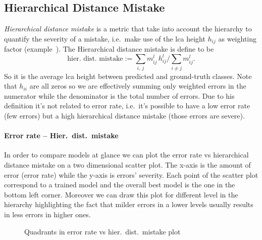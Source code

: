 \subsection{Hierarchical Distance Mistake}
\label{subsec:hierarchical-distance-mistake}
\emph{Hierarchical distance mistake} is a metric that take into account the
hierarchy to quantify the severity of a mistake, i.e.\ make use of the
\acrshort{lca} height $h_{ij}$ as weighting factor
(example~). The Hierarchical distance mistake is
define to be
\begin{equation}
  \textrm{hier.\ dist.\ mistake} :=
  \sum_{i, \, j} m_{ij}^l \, h_{ij}^l \bigg/ \sum_{i \ne j} m_{ij}^l.
  \label{eq:hierarchical-distance-mistake}
\end{equation}
So it is the average \acrshort{lca} height between predicted and ground-truth
classes. Note that $h_{ii}$ are all zeros so we are effectively summing only
weighted errors in the numerator while the denominator is the total number of
errors. Due to his definition it's not related to error rate, i.e.\ it's possible
to have a low error rate (few errors) but a high hierarchical distance mistake
(those errors are severe).

\paragraph{Error rate -- Hier.\ dist.\ mistake}
\label{par:error-rate-hier-dist-mistake}
In order to compare models at glance we can plot the error rate vs hierarchical
distance mistake on a two dimensional scatter plot. The x-axis is the
amount of error (error rate) while the y-axis is errors' severity. Each point of
the scatter plot correspond to a trained model and the overall best model is the
one in the bottom left corner. Moreover we can draw this plot for different
level in the hierarchy highlighting the fact that milder errors in a lower
levels usually results in less errors in higher ones.
\begin{figure}[htbp]
  \caption{Quadrants in error rate vs hier.\ dist.\ mistake plot}
  \label{fig:04/error-rate-hier-dist-mistake}
\end{figure}


